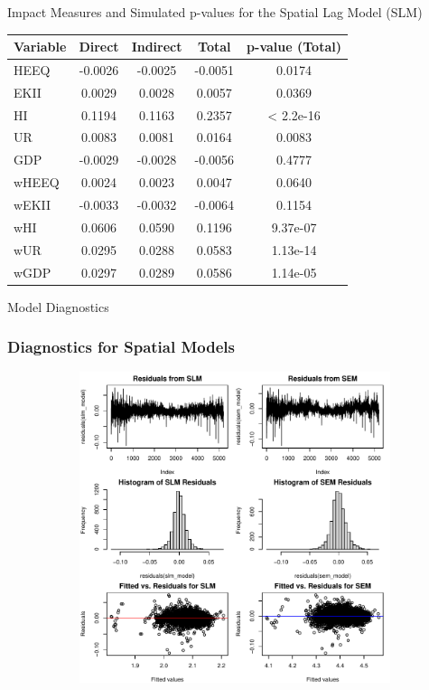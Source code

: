 \documentclass[10pt]{beamer}
\begin{document}
\begin{frame}{Impact Measures and Simulated p-values for the Spatial Lag Model (SLM)}
\begin{table}[ht]
\centering
\begin{tabular}{l|ccc|c}
\hline
\textbf{Variable} & \textbf{Direct} & \textbf{Indirect} & \textbf{Total} & \textbf{p-value (Total)} \\ 
\hline
HEEQ   & -0.0026 & -0.0025 & -0.0051 & 0.0174 \\
EKII   & 0.0029  & 0.0028  & 0.0057  & 0.0369 \\
HI     & 0.1194  & 0.1163  & 0.2357  & < 2.2e-16 \\
UR     & 0.0083  & 0.0081  & 0.0164  & 0.0083 \\
GDP    & -0.0029 & -0.0028 & -0.0056 & 0.4777 \\
wHEEQ  & 0.0024  & 0.0023  & 0.0047  & 0.0640 \\
wEKII  & -0.0033 & -0.0032 & -0.0064 & 0.1154 \\
wHI    & 0.0606  & 0.0590  & 0.1196  & 9.37e-07 \\
wUR    & 0.0295  & 0.0288  & 0.0583  & 1.13e-14 \\
wGDP   & 0.0297  & 0.0289  & 0.0586  & 1.14e-05 \\
\hline
\end{tabular}
\end{table}
\end{frame}


\begin{frame}{Model Diagnostics}
\frametitle{Diagnostics for Spatial Models}
\begin{figure}
\begin{subfigure}[b]{0.9\textheight}
\includegraphics{S_E_Ampah_QRE-plot-diagnostics}
\end{subfigure}
\end{figure}
\end{frame}
\end{document}
